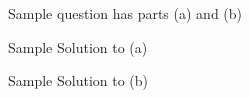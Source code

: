 \documentclass[11pt]{article} %
\begin{document}
	
	\renewcommand*{\CourseCodeAN}{CS XXX - Assignment XX} %
	\renewcommand*{\AssignmentDate}{\today}
	\renewcommand*{\StudentFName}{FirstName } %
	\renewcommand*{\StudentLName}{LastName}
	\renewcommand*{\StudentNum}{XXXXXXXX}
	
	\pagestyle{Assignment} 
	\fancyhfoffset[L,O]{0pt} %
	
	\setcounter{Qnum}{0} %
	\begin{qstn}[1][][2]
		\setcounter{page}{1}
		Sample question has parts (a) and (b)
		\begin{soln}
			Sample Solution to (a)
		\end{soln}

		\begin{soln} %
			Sample Solution to (b)
		\end{soln}
	\end{qstn}
\end{document}
